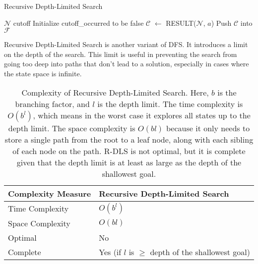 \documentclass[a4paper,UKenglish,cleveref, autoref, thm-restate]{qlinhta}
\begin{document}
    \begin{algorithm}[H]
        \caption{Recursive Depth-Limited Search}\label{alg:recursive_dls}
        \begin{algorithmic}[1]
                    \State \Return $\mathcal{N}$
                    \State \Return cutoff
                \Else
                    \State Initialize cutoff\_occurred to be false
                        \State $\mathcal{C}$ $\gets$ RESULT($\mathcal{N}$, $a$)
                            \State Push $\mathcal{C}$ into $\mathcal{F}$
                        \EndIf
                    \EndFor
                \EndIf
            \EndFunction
        \end{algorithmic}
    \end{algorithm}

    Recursive Depth-Limited Search is another variant of DFS. It introduces a limit on the depth of the search. This limit is useful in preventing the search from going too deep into paths that don't lead to a solution, especially in cases where the state space is infinite.
    \begin{table}[H]
        \centering
        \begin{tabular}{|l|l|}
            \hline
            \textbf{Complexity Measure} & \textbf{Recursive Depth-Limited Search}             \\
            \hline
            Time Complexity             & $O(b^l)$                                            \\
            \hline
            Space Complexity            & $O(bl)$                                             \\
            \hline
            Optimal                     & No                                                  \\
            \hline
            Complete                    & Yes (if $l$ is $\geq$ depth of the shallowest goal) \\
            \hline
        \end{tabular}
        \caption{Complexity of Recursive Depth-Limited Search. Here, $b$ is the branching factor, and $l$ is the depth limit. The time complexity is $O(b^l)$, which means in the worst case it explores all states up to the depth limit. The space complexity is $O(bl)$ because it only needs to store a single path from the root to a leaf node, along with each sibling of each node on the path. R-DLS is not optimal, but it is complete given that the depth limit is at least as large as the depth of the shallowest goal.}
        \label{tab:rdls_complexity_detailed}
    \end{table}
\end{document}
